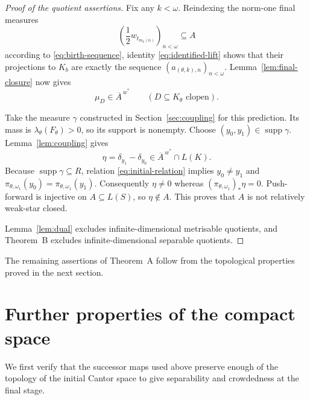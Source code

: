 \documentclass[a4paper,11pt]{amsart}
\theoremstyle{plain}
\theoremstyle{definition}
\theoremstyle{remark}
\newcommand{\supp}{\operatorname{supp}}
\numberwithin{equation}{section}
\begin{document}
\begin{proof}[Proof of the quotient assertions]
Fix any $k<\omega$.  Reindexing the norm-one final measures
\[
 \left(\frac12w_{t_{m_k(n)}}\right)_{n<\omega}
 \subseteq A
\]
according to \eqref{eq:birth-sequence}, identity \eqref{eq:identified-lift} shows that their projections to $K_b$ are exactly the sequence $(a_{(\theta,k),n})_{n<\omega}$.  Lemma~\ref{lem:final-closure} now gives
\[
 \mu_D\in\overline A^{\,w^*}
 \qquad(D\subseteq K_\theta\text{ clopen}).
\]

Take the measure $\gamma$ constructed in Section~\ref{sec:coupling} for this prediction.  Its mass is $\lambda_\theta(F_\theta)>0$, so its support is nonempty.  Choose $(y_0,y_1)\in\supp\gamma$.  Lemma~\ref{lem:coupling} gives
\[
 \eta=\delta_{y_1}-\delta_{y_0}
 \in\overline A^{\,w^*}\cap L(K).
\]
Because $\supp\gamma\subseteq R$, relation \eqref{eq:initial-relation} implies $y_0\neq y_1$ and
$\pi_{\theta,\omega_1}(y_0)=\pi_{\theta,\omega_1}(y_1)$.
Consequently $\eta\neq0$ whereas $(\pi_{\theta,\omega_1})_*\eta=0$.  Push-forward is injective on $A\subseteq L(S)$, so $\eta\notin A$.  This proves that $A$ is not relatively weak-star closed.

Lemma~\ref{lem:dual} excludes infinite-dimensional metrisable quotients, and Theorem~B excludes infinite-dimensional separable quotients.
\end{proof}

The remaining assertions of Theorem~A follow from the topological properties proved in the next section.

\section{Further properties of the compact space}\label{sec:properties}

We first verify that the successor maps used above preserve enough of the topology of the initial Cantor space to give separability and crowdedness at the final stage.
\end{document}
